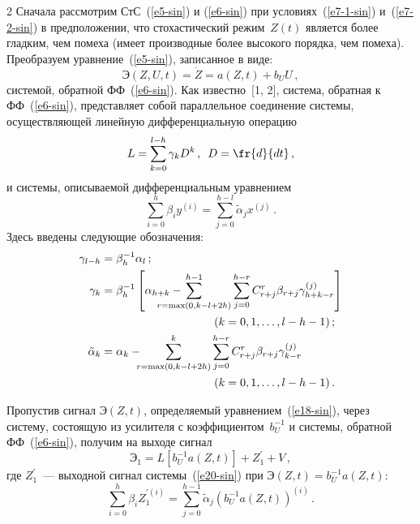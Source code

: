 \begin{multicols}{2}
  Сначала рассмотрим СтС~(\ref{e5-sin}) и (\ref{e6-sin}) при 
  условиях~(\ref{e7-1-sin}) и~(\ref{e7-2-sin}) в предположении, что 
стохастический режим~$Z(t)$ является более гладким, чем помеха (имеет 
производные более высокого порядка, чем помеха). Преобразуем 
урав\-не\-ние~(\ref{e5-sin}), записанное в виде:
  \begin{equation}
  \mathrm{Э}\left( Z,U,t\right) =\dot{Z}=a(Z,t)+b_U U\,,
  \label{e18-sin}
  \end{equation}
сис\-те\-мой, обратной ФФ~(\ref{e6-sin}). Как известно~[1, 2], сис\-те\-ма, обратная к 
ФФ~(\ref{e6-sin}), представляет собой параллельное соединение сис\-те\-мы, 
осуществляющей линейную дифференциальную операцию
\begin{equation*}
L=\sum\limits_{k=0}^{l-h} \gamma_k D^k\,,\enskip D=\fr{d}{dt}\,,
\end{equation*}
и сис\-те\-мы, описываемой дифференциальным урав\-не\-нием
\begin{equation}
\sum\limits_{i=0}^h \beta_i y^{(i)} =\sum\limits_{j=0}^{h-l} \tilde{\alpha}_j 
x^{(j)}\,.
\label{e20-sin}
\end{equation}
    Здесь введены следующие обозначения:
  \begin{align*}
  \gamma_{l-h}&=\beta_h^{-1}\alpha_l\,;\\
  \gamma_k&=\beta_h^{-1}\left[ 
\alpha_{h+k}-\hspace*{-5mm}\hspace*{-9.52328pt}\sum\limits^{h-1}_{r=\max(0,k-l+2h)} 
\sum\limits_{j=0}^{h-r} 
C^r_{r+j}\beta_{r+j}\gamma^{(j)}_{h+k-r}\right] \\
&\hspace*{35mm}(k=0,1,\ldots , l-h-1)\,;\\
  \tilde{\alpha}_k&=\alpha_k- \hspace*{-2mm}\sum\limits^k_{r=\max(0,k-l+2h)} \sum\limits_{j=0}^{h-r}
C^r_{r+j} \beta_{r+j} \gamma^{(j)}_{k-r}\\
&\hspace*{35mm}(k=0,1,\ldots , l-h-1)\,.
  \end{align*}
  
  Пропустив сигнал $\mathrm{Э}(Z,t)$, определяемый 
  урав\-не\-ни\-ем~(\ref{e18-sin}), через сис\-те\-му, со\-сто\-ящую из усилителя с 
коэффициентом~$b_U^{-1}$ и сис\-те\-мы, обратной ФФ~(\ref{e6-sin}), получим 
на выходе сигнал
  \begin{equation*}
  \mathrm{Э}_1=L\left[ b_U^{-1} a(Z,t)\right] +Z_1^\prime +V\,,
  \end{equation*}
где $Z_1^\prime$~--- выходной сигнал сис\-те\-мы~(\ref{e20-sin}) при 
$\mathrm{Э}(Z,t)=b_U^{-1} a(Z,t)$:
\begin{equation}
\sum\limits_{i=0}^h \beta_i Z_1^{\prime(i)}= \sum\limits_{j=0}^{h-1} 
\tilde{\alpha}_j\left( b_U^{-1} a(Z,t)\right)^{(i)}\,.
\label{e23-sin}
\end{equation}
  

\end{multicols}
